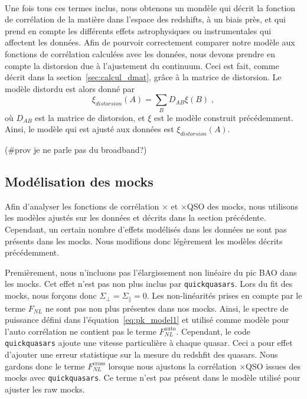 \documentclass[11pt, twoside, a4paper, openright]{report}
\begin{document}
\paragraph{}
Une fois tous ces termes inclus, nous obtenons un mondèle qui décrit la fonction de corrélation de la matière dans l'espace des redshifts, à un biais près, et qui prend en compte les différents effets astrophysiques ou instrumentales qui affectent les données.
Afin de pourvoir correctement comparer notre modèle aux fonctions de corrélation calculées avec les données, nous devons prendre en compte la distorsion due à l'ajustement du continuum. Ceci est fait, comme décrit dans la section~\ref{sec:calcul_dmat}, grâce à la matrice de distorsion. Le modèle distordu est alors donné par
\begin{equation}
  \label{eq:model_dist}
  \xi_{distorsion}(A) = \sum_{B}D_{AB}\xi(B) \; ,
\end{equation}
où $D_{AB}$ est la matrice de distorsion, et $\xi$ est le modèle construit précédemment.
Ainsi, le modèle qui est ajusté aux données est $\xi_{distorsion}(A)$.

(\#prov je ne parle pas du broadband?)




\subsection{Modélisation des mocks}
Afin d'analyser les fonctions de corrélation \lya{}$\times$\lya{} et \lya{}$\times$QSO des mocks, nous utilisons les modèles ajustés sur les données et décrits dans la section précédente. Cependant, un certain nombre d'effets modélisés dans les données ne sont pas présents dans les mocks. Nous modifions donc légèrement les modèles décrits précédemment.

Premièrement, nous n'incluons pas l'élargissement non linéaire du pic BAO dans les mocks. Cet effet n'est pas non plus inclus par \texttt{quickquasars}. Lors du fit des mocks, nous forçons donc $\Sigma_{\perp} = \Sigma_{\parallel} = 0$.
Les non-linéarités prises en compte par le terme $F_{NL}$ ne sont pas non plus présentes dans nos mocks. Ainsi, le spectre de puissance défini dans l'équation~\ref{eq:pk_model1} et utilisé comme modèle pour l'auto corrélation ne contient pas le terme $F_{NL}^{\mathrm{auto}}$. Cependant, le code \texttt{quickquasars} ajoute une vitesse particulière à chaque quasar. Ceci a pour effet d'ajouter une erreur statistique sur la mesure du redshfit des quasars. Nous gardons donc le terme $F_{NL}^{\mathrm{cross}}$ lorsque nous ajustons la corrélation \lya{}$\times$QSO issues des mocks avec \texttt{quickquasars}. Ce terme n'est pas présent dans le modèle utilisé pour ajuster les raw mocks.
\end{document}
